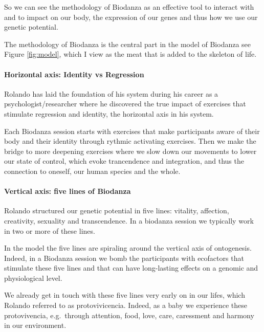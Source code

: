 \documentclass[
]{article}
\begin{document}
So we can see the methodology of Biodanza as an effective tool to interact with and to impact on our body, the expression of our genes and thus how we use our genetic potential.

The methodology of Biodanza is the central part in the model of Biodanza see Figure \ref{fig:model}, which I view as the meat that is added to the skeleton of life.

\hypertarget{horizontal-axis-identity-vs-regression}{%
\paragraph{Horizontal axis: Identity vs Regression}\label{horizontal-axis-identity-vs-regression}}

Rolando has laid the foundation of his system during his career as a psychologist/researcher where he discovered the true impact of exercises that stimulate regression and identity, the horizontal axis in his system.

Each Biodanza session starts with exercises that make participants aware of their body and their identity through rythmic activating exercises.
Then we make the bridge to more deepening exercises where we slow down our movements to lower our state of control, which evoke trancendence and integration, and thus the connection to oneself, our human species and the whole.

\hypertarget{vertical-axis-five-lines-of-biodanza}{%
\paragraph{Vertical axis: five lines of Biodanza}\label{vertical-axis-five-lines-of-biodanza}}

Rolando structured our genetic potential in five lines: vitality, affection, creativity, sexuality and transcendence.
In a biodanza session we typically work in two or more of these lines.

In the model the five lines are spiraling around the vertical axis of ontogenesis. Indeed, in a Biodanza session we bomb the participants with ecofactors that stimulate these five lines and that can have long-lasting effects on a genomic and physiological level.

We already get in touch with these five lines very early on in our lifes, which Rolando referred to as protovivicencia. Indeed, as a baby we experience these protovivencia, e.g.~through attention, food, love, care, caressment and harmony in our environment.
\end{document}
